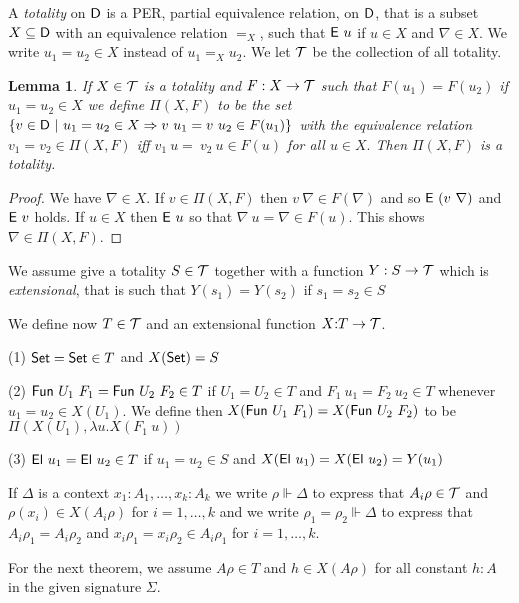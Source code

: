 \documentclass[11pt]{article}
\newtheorem{lemma}[theorem]{Lemma}
\def\DD{\hbox{\sf D}}
\def\Ex{\hbox{\sf E}}
\def\FUN{\hbox{\sf Fun}}
\def\TOT{{\cal T}}
\def\SET{\hbox{\sf Set}}
\def\EL{\hbox{\sf El}}
\begin{document}
A {\em totality} on $\DD$
is a PER, partial equivalence relation, on $\DD$, that is a subset $X\subseteq \DD$ with
an equivalence relation $=_X$, such that $\Ex~u$ if $u\in X$ and $\nabla\in X$. We write
$u_1=u_2\in X$ instead of $u_1=_X u_2$.
We let $\TOT$ be the collection of all totality.

\begin{lemma}
If $X\in\TOT$ is a totality and $F:X\rightarrow\TOT$ such that
$F(u_1)=F(u_2)$ if $u_1= u_2\in X$ we define $\Pi(X,F)$ to be the set
$ \{v\in\DD~|~u_1= u_2\in X\Rightarrow v~u_1 = v~u_2\in {F(u_1)}\}$
with the equivalence relation $v_1{=}v_2\in {\Pi(X,F)}$ iff $v_1~u{=}~ v_2~u\in {F(u)}$ for
all $u\in X.$ Then $\Pi(X,F)$ is a totality.
\end{lemma}

\begin{proof}
We have $\nabla\in X$. If $v\in\Pi(X,F)$  then  $v~\nabla\in F(\nabla)$ and so $\Ex~(v~\nabla)$ and
$\Ex~v$ holds. If $u\in X$ then $\Ex~u$ so that $\nabla~u =\nabla\in F(u)$. This shows $\nabla\in \Pi(X,F)$.
\end{proof}

 We assume give a totality $S\in\TOT$ together with a function $Y:S\rightarrow\TOT$ which
is {\em extensional}, that is such that $Y(s_1) = Y(s_2)$ if $s_1= s_2\in S$


 We define now $T\in\TOT$ and an extensional function $X{:}T\rightarrow\TOT$.

\medskip

 (1) $\SET=\SET\in T$ and $X(\SET) = S$

\medskip

 (2) $\FUN~U_1~F_1 = \FUN~U_2~F_2\in T$ if $U_1=U_2\in T$ and $F_1~u_1=F_2~u_2\in T$ whenever $u_1=u_2\in X(U_1)$. We
define then $X(\FUN~U_1~F_1)=X(\FUN~U_2~F_2)$ to be $\Pi(X(U_1),\lambda u.X(F_1~u))$

\medskip

 (3) $\EL~u_1=\EL~u_2\in T$ if $u_1=u_2\in S$ and $X(\EL~u_1) = X(\EL~u_2) = Y(u_1)$

\medskip

 If $\Delta$ is a context $x_1{:}A_1,\dots,x_k{:}A_k$ we write $\rho\Vdash\Delta$ to
express that $A_i\rho\in\TOT$ and $\rho(x_i)\in X(A_i\rho)$ for $i=1,\dots,k$ and
we write $\rho_1=\rho_2\Vdash\Delta$ to express that $A_i\rho_1=A_i\rho_2$ and
$x_i\rho_1 = x_i\rho_2\in A_i\rho_1$ for $i=1,\dots,k$.

 For the next theorem, we assume $A\rho\in T$ and $h\in X(A\rho)$ for all
constant $h{:}A$ in the given signature $\Sigma$.
\end{document}
